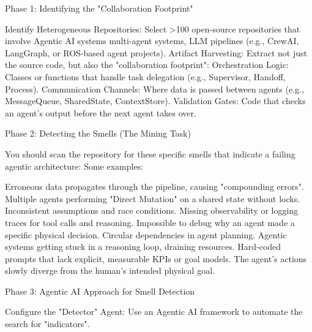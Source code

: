 
Phase 1: Identifying the "Collaboration Footprint"

Identify Heterogeneous Repositories: Select >100 open-source repositories that involve Agentic AI systems multi-agent systems, LLM pipelines (e.g., CrewAI, LangGraph, or ROS-based agent projects).
Artifact Harvesting: Extract not just the source code, but also the "collaboration footprint":
Orchestration Logic: Classes or functions that handle task delegation (e.g., Supervisor, Handoff, Process).
Communication Channels: Where data is passed between agents (e.g., MessageQueue, SharedState, ContextStore).
Validation Gates: Code that checks an agent's output before the next agent takes over.

Phase 2: Detecting the Smells (The Mining Task)

You should scan the repository for these specific smells that indicate a failing agentic architecture:
Some examples:

Erroneous data propagates through the pipeline, causing "compounding errors".
Multiple agents performing "Direct Mutation" on a shared state without locks.
Inconsistent assumptions and race conditions.	
Missing observability or logging traces for tool calls and reasoning.
Impossible to debug why an agent made a specific physical decision.	
Circular dependencies in agent planning.
Agentic systems getting stuck in a reasoning loop, draining resources.
Hard-coded prompts that lack explicit, measurable KPIs or goal models.
The agent's actions slowly diverge from the human's intended physical goal.


Phase 3: Agentic AI Approach for Smell Detection

Configure the "Detector" Agent: Use an Agentic AI framework to automate the search for "indicators".
